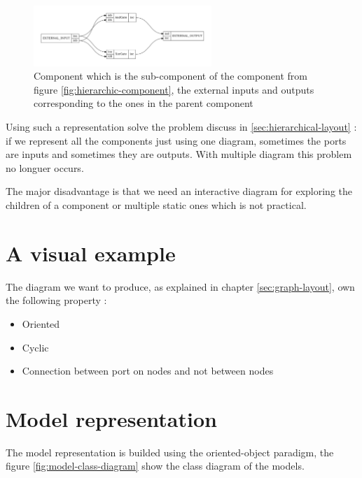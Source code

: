 \begin{figure}[H]
  \centering
  \includegraphics[width=0.6\textwidth]{img/AndXorGate.pdf}
  \caption[SpinalHDL Component inside an another]{Component which is the
    sub-component of the component from figure \ref{fig:hierarchic-component},
    the external inputs and outputs corresponding to the ones in the parent component}
  \label{fig:and-xor-gate}
\end{figure}

Using such a representation solve the problem discuss in
\ref{sec:hierarchical-layout} : if we represent all the components just using
one diagram, sometimes the ports are inputs and sometimes they are outputs. With
multiple diagram this problem no longuer occurs.

The major disadvantage is that we need an interactive diagram for exploring
the children of a component or multiple static ones which is not practical.

\section{A visual example}

The diagram we want to produce, as explained in chapter \ref{sec:graph-layout}, own the following property :
\begin{itemize}
  \item Oriented
  \item Cyclic
  \item Connection between port on nodes and not between nodes
\end{itemize}

\section{Model representation}
\label{sec:model-representation} 

The model representation is builded using the oriented-object paradigm, the
figure \ref{fig:model-class-diagram} show the class diagram of the models.

